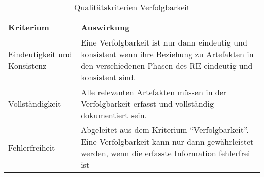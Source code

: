\begin{table}[ht]
\renewcommand{\arraystretch}{1.3}
\centering
\begin{threeparttable}
\begin{tabularx}{\columnwidth}{@{}lX@{}}
\toprule
Kriterium & Auswirkung\\ \midrule
Eindeutigkeit und Konsistenz & Eine Verfolgbarkeit ist nur dann eindeutig und konsistent wenn ihre Beziehung zu Artefakten in den verschiedenen Phasen des RE eindeutig und konsistent sind. \\
Vollständigkeit & Alle relevanten Artefakten müssen in der Verfolgbarkeit erfasst und vollständig dokumentiert sein. \\
Fehlerfreiheit & Abgeleitet aus dem Kriterium \enquote{Verfolgbarkeit}. Eine Verfolgbarkeit kann nur dann gewährleistet werden, wenn die erfasste Information fehlerfrei ist \\
\bottomrule
\end{tabularx}
\medskip
\end{threeparttable}
\caption{Qualitätskriterien Verfolgbarkeit}
\label{tab:qualitaet_verfolgbarkeit}
\end{table}



